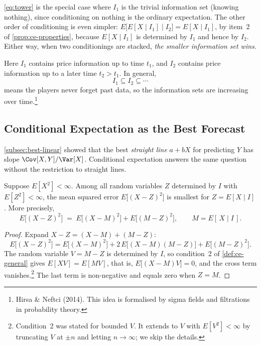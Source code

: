 \eqref{eq:tower} is the special case where $I_{1}$ is the trivial information set (knowing nothing), since conditioning on nothing is the ordinary expectation.
The other order of conditioning is even simpler:
$E\bigl[E[X\mid I_{1}]\mid I_{2}\bigr]=E[X\mid I_{1}]$, by item~2 of \autoref{prop:ce-properties}, because $E[X\mid I_{1}]$ is determined by $I_{1}$ and hence by $I_{2}$.
Either way, when two conditionings are stacked, \emph{the smaller information set wins}.
\suppend

Here $I_{1}$ contains price information up to time $t_{1}$, and $I_{2}$ contains price information up to a later time $t_{2}>t_{1}$.
In general,
\[
	I_{1}\subseteq I_{2}\subseteq\cdots
\]
means the players never forget past data, so the information sets are increasing over time.\footnote{Hirsa \& Neftci (2014). This idea is formalised by sigma fields and filtrations in probability theory.}

\subsection{Conditional Expectation as the Best Forecast}

\suppstart
\autoref{subsec:best-linear} showed that the best \emph{straight line} $a+bX$ for predicting $Y$ has slope $\Cov[X,Y]/\Var[X]$.
Conditional expectation answers the same question without the restriction to straight lines.

\begin{theorem}\label{thm:ce-best}
	Suppose $E[X^{2}]<\infty$.
	Among all random variables $Z$ determined by $I$ with $E[Z^{2}]<\infty$, the mean squared error $E\bigl[(X-Z)^{2}\bigr]$ is smallest for $Z=E[X\mid I]$.
	More precisely,
	\begin{equation}
		E\bigl[(X-Z)^{2}\bigr] \;=\; E\bigl[(X-M)^{2}\bigr] + E\bigl[(M-Z)^{2}\bigr] ,
		\qquad M=E[\,X\mid I\,] . \label{eq:ce-pythagoras}
	\end{equation}
\end{theorem}

\begin{proof}
	Expand $X-Z=(X-M)+(M-Z)$:
	\[
		E\bigl[(X-Z)^{2}\bigr] = E\bigl[(X-M)^{2}\bigr] + 2\,E\bigl[(X-M)(M-Z)\bigr] + E\bigl[(M-Z)^{2}\bigr] .
	\]
	The random variable $V=M-Z$ is determined by $I$, so condition~2 of \autoref{def:ce-general} gives $E[XV]=E[MV]$, that is, $E\bigl[(X-M)V\bigr]=0$, and the cross term vanishes.\footnote{Condition~2 was stated for bounded $V$. It extends to $V$ with $E[V^{2}]<\infty$ by truncating $V$ at $\pm n$ and letting $n\to\infty$; we skip the details.}
	The last term is non-negative and equals zero when $Z=M$.
\end{proof}

